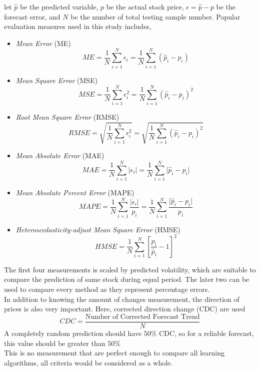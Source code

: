let $ \hat{p} $ be the predicted variable, $ p $ be the actual stock price, $ \epsilon = \hat{p} - p $ be the forecast error, and $ N $ be the number of total testing sample number. Popular evaluation measures used in this study includes\cite{poon2005practical},
\begin{itemize}
	\item \textit{Mean Error} (ME)
	\begin{equation}
	ME=\frac{1}{N} \sum_{i=1}^{N}\epsilon_i=\frac{1}{N} \sum_{i=1}^{N} (\hat{p}_i - p_i)
	\end{equation}
	
	\item \textit{Mean Square Error} (MSE)
	\begin{equation}
	MSE = \frac{1}{N} \sum_{i=1}^{N}\epsilon_i^2=\frac{1}{N} \sum_{i=1}^{N} (\hat{p}_i - p_i)^2
	\end{equation}
	
	\item \textit{Root Mean Square Error} (RMSE)
	\begin{equation}
	RMSE = \sqrt{\frac{1}{N} \sum_{i=1}^{N}\epsilon_i^2}=\sqrt{\frac{1}{N} \sum_{i=1}^{N} (\hat{p}_i - p_i)^2}
	\end{equation}
	
	\item \textit{Mean Absolute Error} (MAE)
	\begin{equation}
	MAE=\frac{1}{N} \sum_{i=1}^{N} \lvert \epsilon_i \rvert =\frac{1}{N} \sum_{i=1}^{N} \lvert \hat{p}_i - p_i \rvert
	\end{equation}
	
	\item \textit{Mean Absolute Percent Error} (MAPE)
	\begin{equation}
	MAPE=\frac{1}{N} \sum_{i=1}^{N} \frac{\lvert \epsilon_i \rvert}{p_i} =\frac{1}{N} \sum_{i=1}^{N} \frac{\lvert \hat{p}_i - p_i \rvert}{p_i}
	\end{equation}
	
	\item \textit{Heteroscedasticity-adjust Mean Square Error} (HMSE)
	\begin{equation}
	HMSE=\frac{1}{N} \sum_{i=1}^{N}[\frac{p_i}{\hat{p}_i}- 1]^2
	\end{equation}
\end{itemize}
The first four measurements is scaled by predicted volatility, which are suitable to compare the prediction of same stock during equal period. The later two can be used to compare every method as they represent percentage errors.\\


In addition to knowing the amount of changes measurement, the direction of prices is also very important. Here, corrected direction change (CDC)\cite{naeini2010stock} are used
\begin{equation}
CDC = \frac{\text{Number of Corrected Forecast Trend}}{N}
\end{equation}
A completely random prediction should have $ 50\% $ CDC, so for a reliable forecast, this value should be greater than $ 50\% $\\


This is no measurement that are perfect enough to compare all learning algorithms, all criteria would be considered as a whole.